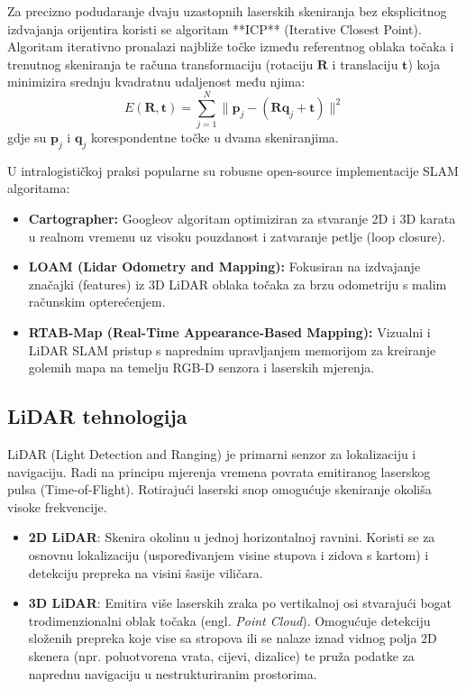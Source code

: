 Za precizno podudaranje dvaju uzastopnih laserskih skeniranja bez eksplicitnog izdvajanja orijentira koristi se algoritam **ICP** (Iterative Closest Point). Algoritam iterativno pronalazi najbliže točke između referentnog oblaka točaka i trenutnog skeniranja te računa transformaciju (rotaciju $\mathbf{R}$ i translaciju $\mathbf{t}$) koja minimizira srednju kvadratnu udaljenost među njima:
\begin{equation}
    E(\mathbf{R}, \mathbf{t}) = \sum_{j=1}^{N} \| \mathbf{p}_j - (\mathbf{R} \mathbf{q}_j + \mathbf{t}) \|^2
\end{equation}
gdje su $\mathbf{p}_j$ i $\mathbf{q}_j$ korespondentne točke u dvama skeniranjima.

U intralogističkoj praksi popularne su robusne open-source implementacije SLAM algoritama:
\begin{itemize}
    \item \textbf{Cartographer:} Googleov algoritam optimiziran za stvaranje 2D i 3D karata u realnom vremenu uz visoku pouzdanost i zatvaranje petlje (loop closure).
    \item \textbf{LOAM (Lidar Odometry and Mapping):} Fokusiran na izdvajanje značajki (features) iz 3D LiDAR oblaka točaka za brzu odometriju s malim računskim opterećenjem.
    \item \textbf{RTAB-Map (Real-Time Appearance-Based Mapping):} Vizualni i LiDAR SLAM pristup s naprednim upravljanjem memorijom za kreiranje golemih mapa na temelju RGB-D senzora i laserskih mjerenja.
\end{itemize}

\subsection{LiDAR tehnologija}
LiDAR (Light Detection and Ranging) je primarni senzor za lokalizaciju i navigaciju. Radi na principu mjerenja vremena povrata emitiranog laserskog pulsa (Time-of-Flight). Rotirajući laserski snop omogućuje skeniranje okoliša visoke frekvencije. 
\begin{itemize}
    \item \textbf{2D LiDAR}: Skenira okolinu u jednoj horizontalnoj ravnini. Koristi se za osnovnu lokalizaciju (uspoređivanjem visine stupova i zidova s kartom) i detekciju prepreka na visini šasije viličara.
    \item \textbf{3D LiDAR}: Emitira više laserskih zraka po vertikalnoj osi stvarajući bogat trodimenzionalni oblak točaka (engl. \textit{Point Cloud}). Omogućuje detekciju složenih prepreka koje vise sa stropova ili se nalaze iznad vidnog polja 2D skenera (npr. poluotvorena vrata, cijevi, dizalice) te pruža podatke za naprednu navigaciju u nestrukturiranim prostorima.
\end{itemize}

